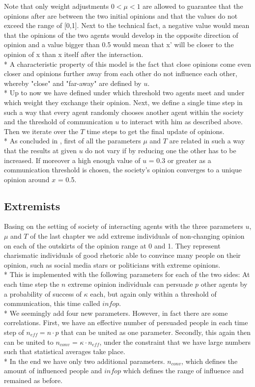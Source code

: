 \documentclass[11pt]{article}
\begin{document}
Note that only weight adjustments $0 < \mu < 1$ are allowed to guarantee that the opinions after are between the two initial opinions and that the values do not exceed the range of [0,1]. Next to the technical fact, a negative value would mean that the opinions of the two agents would develop in the opposite direction of opinion and a value bigger than 0.5 would mean that x' will be closer to the opinion of x than x itself after the interaction. \\*
A characteristic property of this model is the fact that close opinions come even closer and opinions further away from each other do not influence each other, whereby "close" and "far-away" are defined by $u$. \\*
Up to now we have defined under which threshold two agents meet and under which weight they exchange their opinion. Next, we define a single time step in such a way that every agent randomly chooses another agent within the society and the threshold of communication $u$ to interact with him as described above. Then we iterate over the $T$ time steps to get the final update of opinions. \\*
As concluded in \cite{Minor}, first of all the parameters $\mu$ and $T$ are related in such a way that the results at given $u$ do not vary if by reducing one the other has to be increased. If moreover a high enough value of $u$ = 0.3 or greater as a communication threshold is chosen, the society's opinion converges to a unique opinion around $x$ = 0.5.

\subsection{Extremists}
Basing on the setting of society of interacting agents with the three parameters $u$, $\mu$ and $T$ of the last chapter we add extreme individuals of non-changing opinion on each of the outskirts of the opinion range at 0 and 1. They represent charismatic individuals of good rhetoric able to convince many people on their opinion, such as social media stars or politicians with extreme opinions. \\*
This is implemented with the following parameters for each of the two sides: At each time step the $n$ extreme opinion individuals can persuade $p$ other agents by a probability of success of $\kappa$ each, but again only within a threshold of communication, this time called $infop$. \\*
We seemingly add four new parameters. However, in fact there are some correlations.
First, we have an effective number of persuaded people in each time step of $n_{eff} = n \cdot p$ that can be united as one parameter. Secondly, this again then can be united to $n_{conv}$ = $\kappa \cdot n_{eff}$, under the constraint that we have large numbers such that statistical averages take place. \\*
In the end we have only two additional parameters. $n_{conv}$, which defines the amount of influenced people and $infop$ which defines the range of influence and remained as before.
\end{document}
